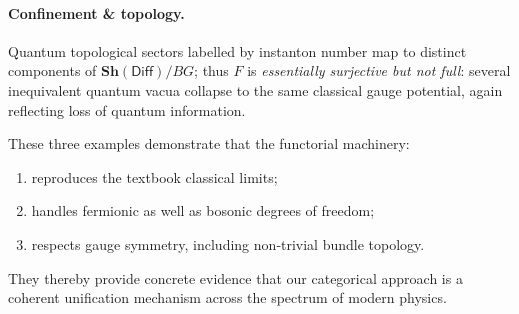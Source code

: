 \medskip

\paragraph{Confinement \& topology.}
Quantum topological sectors labelled by instanton number map to distinct
components of $\mathbf{Sh}(\mathsf{Diff})/BG$; thus $F$ is
\emph{essentially surjective but not full}: several inequivalent quantum vacua
collapse to the same classical gauge potential, again reflecting loss of
quantum information.

\bigskip

These three examples demonstrate that the functorial machinery:
\begin{enumerate}
  \item reproduces the textbook classical limits;
  \item handles fermionic as well as bosonic degrees of freedom;
  \item respects gauge symmetry, including non‑trivial bundle topology.
\end{enumerate}

They thereby provide concrete evidence that our categorical approach is a
coherent unification mechanism across the spectrum of modern physics.